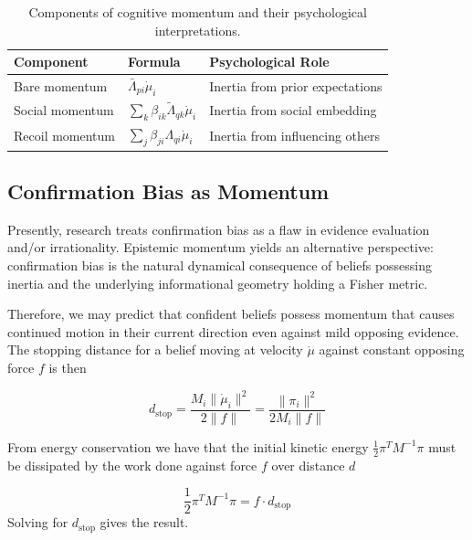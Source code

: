 \documentclass[12pt]{article}
\begin{document}
\begin{table}[ht]
\centering
\caption{Components of cognitive momentum and their psychological interpretations.}
\label{tab:momentum-components}
\renewcommand{\arraystretch}{1.3}
\begin{tabular}{@{} l l l @{}}
\toprule
\textbf{Component} & \textbf{Formula} & \textbf{Psychological Role} \\
\midrule
Bare momentum & $\bar{\Lambda}_{pi}\dot{\mu}_i$ & Inertia from prior expectations \\
Social momentum & $\sum_k\beta_{ik}\tilde{\Lambda}_{qk}\dot{\mu}_i$ & Inertia from social embedding \\
Recoil momentum & $\sum_j\beta_{ji}\Lambda_{qi}\dot{\mu}_i$ & Inertia from influencing others \\
\bottomrule
\end{tabular}
\end{table}

\subsection{Confirmation Bias as Momentum}

Presently, research treats confirmation bias as a flaw in evidence evaluation and/or irrationality. Epistemic momentum yields an alternative perspective: confirmation bias is the natural dynamical consequence of beliefs possessing inertia and the underlying informational geometry holding a Fisher metric.

Therefore, we may predict that confident beliefs possess momentum that causes continued motion in their current direction even against mild opposing evidence. The stopping distance for a belief moving at velocity $\dot{\mu}$ against constant opposing force $f$ is then

\begin{equation}
d_{\text{stop}} = \frac{M_i \|\dot{\mu}_i\|^2}{2\|f\|}= \frac{\|\pi_i\|^2}{2M_i\|f\|}
\end{equation}


From energy conservation we have that the initial kinetic energy $\frac{1}{2}\pi^T M^{-1}\pi$ must be dissipated by the work done against force $f$ over distance $d$

\begin{equation}
\frac{1}{2}\pi^T M^{-1}\pi = f \cdot d_{\text{stop}}
\end{equation}
Solving for $d_{\text{stop}}$ gives the result.
\end{document}

